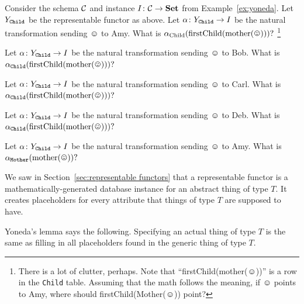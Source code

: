 \documentclass[CT4S-EN-RU]{subfiles}
\begin{document}
\begin{exerciseENG}
Consider the schema $\mathcal{C}$ and instance $I\colon\mathcal{C}\rightarrow{\mathbf{Set}}$ from Example~\ref{ex:yoneda}. Let $Y_{\tt Child}$ be the representable functor as above. 
\sexc Let $\alpha\colon Y_{\tt Child}\rightarrow I$ be the natural transformation sending $\smiley$ to Amy. What is $\alpha_{\tn{Child}}(\tn{firstChild(mother}(\smiley)))?$
\footnote{There is a lot of clutter, perhaps. Note that “firstChild(mother($\smiley$))” is a row in the {\tt Child} table. Assuming that the math follows the meaning, if $\smiley$ points to Amy, where should firstChild(Mother($\smiley$)) point?}
\item Let $\alpha\colon Y_{\tt Child}\rightarrow I$ be the natural transformation sending $\smiley$ to Bob. What is $\alpha_{\tt Child}(\tn{firstChild(mother}(\smiley)))?$
\item Let $\alpha\colon Y_{\tt Child}\rightarrow I$ be the natural transformation sending $\smiley$ to Carl. What is $\alpha_{\tt Child}(\tn{firstChild(mother}(\smiley)))?$
\item Let $\alpha\colon Y_{\tt Child}\rightarrow I$ be the natural transformation sending $\smiley$ to Deb. What is $\alpha_{\tt Child}(\tn{firstChild(mother}(\smiley)))?$
\item Let $\alpha\colon Y_{\tt Child}\rightarrow I$ be the natural transformation sending $\smiley$ to Amy. What is $\alpha_{\tt Mother}(\tn{mother}(\smiley))?$
\endsexc
\end{exerciseENG}

\begin{exerciseRUS}
\end{exerciseRUS}

\begin{blockENG}
We saw in Section~\ref{sec:representable functors} that a representable functor is a mathematically-generated database instance for an abstract thing of type $T.$ It creates placeholders for every attribute that things of type $T$ are supposed to have.
\end{blockENG}

\begin{blockRUS}
\end{blockRUS}

\begin{sloganENG}
Yoneda's lemma says the following. Specifying an actual thing of type $T$ is the same as filling in all placeholders found in the generic thing of type $T.$
\end{sloganENG}

\begin{sloganRUS}
\end{sloganRUS}
\end{document}

